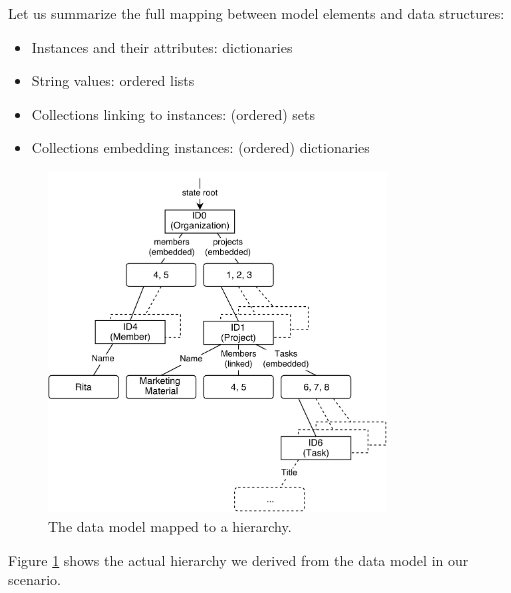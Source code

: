 Let us summarize the full mapping between model elements and data structures:

\begin{itemize}
\item Instances and their attributes: dictionaries
\item String values: ordered lists
\item Collections linking to instances: (ordered) sets
\item Collections embedding instances: (ordered) dictionaries
\end{itemize}

\begin{figure}[hierarchy]
  \centering
  \includegraphics[width=0.8\textwidth]{img/hierarchy}
  \caption{The data model mapped to a hierarchy.}
  \label{fig:histo.hierarchy}
\end{figure}

Figure \ref{fig:histo.hierarchy} shows the actual hierarchy we derived from the data model in our scenario.

